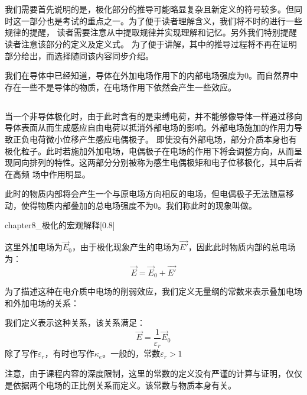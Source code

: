 \section[电介质的极化]{}
我们需要首先说明的是，极化部分的推导可能略显复杂且新定义的符号较多。但同时这一部分也是考试的重点之一。为了便于读者理解含义，我们将不时的进行一些规律的提醒，
读者需要注意从中提取规律并实现理解和记忆。另外我们特别提醒读者注意该部分的定义及定义式。
为了便于讲解，其中的推导过程将不再在证明部分给出，而选择随同该内容同步介绍。

我们在导体中已经知道，导体在外加电场作用下的内部电场强度为0。而自然界中存在一些不是导体的物质，在电场作用下依然会产生一些效应。
\subsection[极化的定义]{}
当一个非导体极化时，由于此时含有的是束缚电荷，并不能够像导体一样通过移向导体表面从而生成感应自由电荷以抵消外部电场的影响。外部电场施加的作用力导致正负电荷微小位移产生感应电偶极子。
即使没有外部电场，部分介质本身也有极化粒子。此时若施加外加电场，电偶极子在电场的作用下将会调整方向，从而呈现同向排列的特性。这两部分分别被称为感生电偶极矩和电子位移极化，其中后者在高频
场中作用明显。

此时的物质内部将会产生一个与原电场方向相反的电场，但电偶极子无法随意移动，使得物质内部叠加的总电场强度不为0。我们称此时的现象叫做。
\begin{singlefigure}[极化的宏观效应]{chapter8_极化的宏观解释}[0.8]
\end{singlefigure}

这里外加电场为$\vec{E}_0$，由于极化现象产生的电场为$\vec{E'}$，因此此时物质内部的总电场为：
\[\vec{E}=\vec{E}_0 + \vec{E'}\]

为了描述这种在电介质中电场的削弱效应，我们定义无量纲的常数来表示叠加电场和外加电场的关系：
\begin{law}
    我们定义表示这种关系，该关系满足：
    \[\vec{E}=\dfrac{1}{\varepsilon_r}\vec{E}_0\]
    除了写作$\varepsilon_r$，有时也写作$\kappa_e$。一般的，常数$\varepsilon_r > 1$
\end{law}

注意，由于课程内容的深度限制，这里的常数的定义没有严谨的计算与证明，仅仅是依据两个电场的正比例关系而定义。该常数与物质本身有关。

